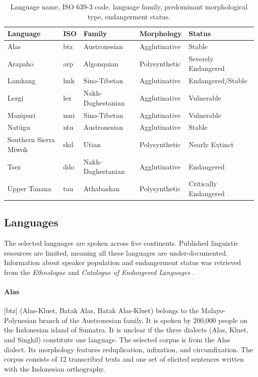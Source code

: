 \bgroup
\def\arraystretch{1.25}
\begin{table}[h!]
    \begin{center}
    \begin{tabular}{lllll} 
    \textbf{Language} & \textbf{ISO} & \textbf{Family} & \textbf{Morphology} & \textbf{Status} \\
    \hline
    Alas & btz & Austronesian & Agglutinative & Stable \\
    Arapaho & arp & Algonquian & Polysynthetic & Severely Endangered  \\
    Lamkang & lmk & Sino-Tibetan & Agglutinative & Endangered/Stable   \\
    Lezgi & lez & Nakh-Daghestanian & Agglutinative & Vulnerable \\
    Manipuri & mni & Sino-Tibetan & Agglutinative & Vulnerable  \\
    Natügu & ntu & Austronesian & Agglutinative & Stable \\
    Southern Sierra Miwok & skd & Utian & Polysynthetic & Nearly Extinct \\ 
    Tsez & ddo & Nakh-Daghestanian & Agglutinative & Endangered \\
    Upper Tanana & tau & Athabaskan & Polysynthetic & Critically Endangered \\
	\end{tabular}
	\caption[Data]{Language name, ISO 639-3 code, language family, predominant morphological type, endangerment status.}
	\label{tab:langs}
\end{center}
\end{table}


\subsection{Languages} 

The selected languages are spoken across five continents.
Published linguistic resources are limited, meaning all these languages are under-documented. Information about speaker population and endangerment status was retrieved from the \emph{Ethnologue} \citep{eberhard_ethnologue:2020} and \emph{Catalogue of Endangered Languages} \citep{elcat_2020}.

\paragraph{Alas}
[btz] (Alas-Kluet, Batak Alas, Batak Alas-Kluet) belongs to the Malayo-Polynesian branch of the Austronesian family. It is spoken by 200,000 people on the Indonesian island of Sumatra. It is unclear if the three dialects (Alas, Kluet, and Singkil) constitute one language. The selected corpus is from the Alas dialect.  Its morphology features reduplication, infixation, and circumfixation. The corpus consists of 12 transcribed texts and one set of elicited sentences written with the Indonesian orthography. 

